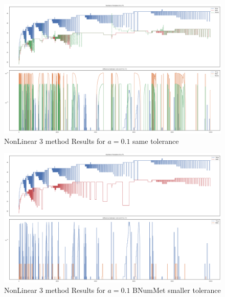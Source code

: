 \begin{figure}
    \centering
    \includegraphics[width=\textwidth]{Include/Images/Thesis/Analysis of Solutions/NonLinear AS/NonLinear 3 method Results a-0.1.png}
    \caption{NonLinear 3 method Results for $a=0.1$ same tolerance}
    \label{fig:NonLinear 3 method Results for a=0.1 same tolerance}
\end{figure}

\begin{figure}
    \centering
    \includegraphics[width=\textwidth]{Include/Images/Thesis/Analysis of Solutions/NonLinear AS/NonLinear 3 method Results Small Tol Bnum a-0.1.png}
    \caption{NonLinear 3 method Results for $a=0.1$ BNumMet smaller tolerance}
    \label{fig:NonLinear 3 method Results for a=0.1 BNumMet smaller tolerance}
\end{figure}


